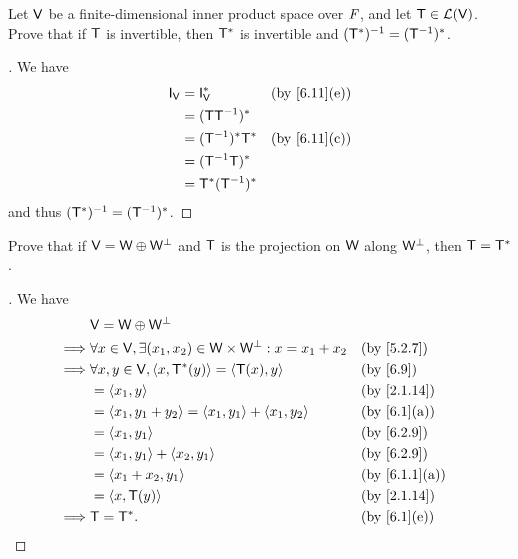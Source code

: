 \begin{ex}\label{ex:6.3.8}
  Let \(\mathsf{V}\) be a finite-dimensional inner product space over \(\mathit{F}\), and let \(\mathsf{T} \in \mathcal{L}(\mathsf{V})\).
  Prove that if \(\mathsf{T}\) is invertible, then \(\mathsf{T}^*\) is invertible and \((\mathsf{T}^*)^{-1} = (\mathsf{T}^{-1})^*\).
\end{ex}

\begin{proof}[]
  We have
  \begin{align*}
    \IT[\V] & = \IT[\V]^*        &  & \text{(by \cref{6.11}(e))} \\
            & = (\T \T^{-1})^*                                   \\
            & = (\T^{-1})^* \T^* &  & \text{(by \cref{6.11}(c))} \\
            & = (\T^{-1} \T)^*                                   \\
            & = \T^* (\T^{-1})^*
  \end{align*}
  and thus \((\mathsf{T}^*)^{-1} = (\mathsf{T}^{-1})^*\).
\end{proof}

\begin{ex}\label{ex:6.3.9}
  Prove that if \(\mathsf{V} = \mathsf{W} \oplus \mathsf{W}^{\perp}\) and \(\mathsf{T}\) is the projection on \(\mathsf{W}\) along \(\mathsf{W}^{\perp}\), then \(\mathsf{T} = \mathsf{T}^*\).
\end{ex}

\begin{proof}[]
  We have
  \begin{align*}
             & \V = \W \oplus \W^{\perp}                                                                                      \\
    \implies & \forall x \in \V, \exists (x_1, x_2) \in \W \times \W^{\perp} : x = x_1 + x_2 &  & \text{(by \cref{5.2.7})}    \\
    \implies & \forall x, y \in \V, \inn{x, \T^*(y)} = \inn{\T(x), y}                        &  & \text{(by \cref{6.9})}      \\
             & = \inn{x_1, y}                                                                &  & \text{(by \cref{2.1.14})}   \\
             & = \inn{x_1, y_1 + y_2} = \inn{x_1, y_1} + \inn{x_1, y_2}                      &  & \text{(by \cref{6.1}(a))}   \\
             & = \inn{x_1, y_1}                                                              &  & \text{(by \cref{6.2.9})}    \\
             & = \inn{x_1, y_1} + \inn{x_2, y_1}                                             &  & \text{(by \cref{6.2.9})}    \\
             & = \inn{x_1 + x_2, y_1}                                                        &  & \text{(by \cref{6.1.1}(a))} \\
             & = \inn{x, \T(y)}                                                              &  & \text{(by \cref{2.1.14})}   \\
    \implies & \T = \T^*.                                                                    &  & \text{(by \cref{6.1}(e))}
  \end{align*}
\end{proof}

